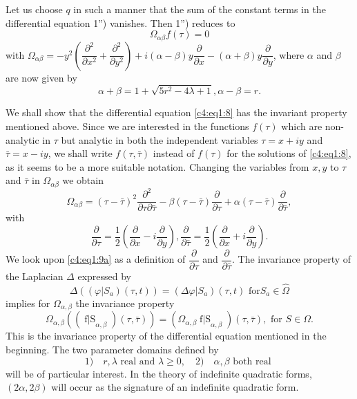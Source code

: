 Let us choose $q$ in such a manner that the sum of the constant terms
in the differential equation 1'') vanishes. Then 1'') reduces to 
\begin{equation*}
\Omega_{\alpha\beta}f(\tau) = 0 \tag{8}\label{c4:eq1:8}
\end{equation*}
with $\Omega_{\alpha\beta}= -y^2(\dfrac{\partial^2}{\partial x^2} +
\dfrac{\partial^2}{\partial y^2}) +
i(\alpha-\beta)y\dfrac{\partial}{\partial x} - (\alpha+\beta)
y\dfrac{\partial}{\partial y}$, where \pageoriginale $\alpha$ and
$\beta$ are now given by
$$ 
\alpha + \beta = 1 + \sqrt{5r^2 - 4\lambda + 1}, \alpha - \beta = r.
$$

We shall show that the differential equation \eqref{c4:eq1:8} has the invariant
property mentioned above. Since we are interested in the functions
$f(\tau)$ which are non-analytic in $\tau$ but analytic in both the
independent variables $\tau=x+iy$ and $\bar{\tau}=x-iy$, we shall
write $f(\tau,\bar{\tau})$ instead of $f(\tau)$ for the solutions of
\eqref{c4:eq1:8}, as it seems to be a more suitable notation. Changing the
variables from $x,y$ to $\tau$ and $\bar{\tau}$ in
$\Omega_{\alpha\beta}$ we obtain 
\begin{equation*}
\Omega_{\alpha\beta} = (\tau-\bar{\tau})^2 \frac{\partial^2}{\partial
  \tau \partial \bar{\tau}} - \beta(\tau-\bar{\tau})
\frac{\partial}{\partial \tau} + \alpha (\tau-\bar{\tau})
\frac{\partial}{\partial \bar{\tau}}, \tag{9}\label{c4:eq1:9}
\end{equation*}
with 
\begin{equation*}
\frac{\partial}{\partial \tau} = \frac{1}{2} (\frac{\partial}{\partial
x} - i \frac{\partial}{\partial y}), \frac{\partial}{\partial
  \bar{\tau}}  =\frac{1}{2} (\frac{\partial}{\partial
  x}+i\frac{\partial}{\partial y}). \tag{9a}\label{c4:eq1:9a}
\end{equation*}
We look upon \eqref{c4:eq1:9a} as a definition of $\dfrac{\partial}{\partial \tau}$
and $\dfrac{\partial}{\partial \bar{\tau}}$. The invariance property
of the Laplacian $\Delta$ expressed by
$$
\Delta((\varphi|S_a)(\tau,t)) = (\Delta\varphi|S_a)(\tau,t) \text{ for
} S_a \in \hat{\Omega}
$$
implies for $\Omega_{\alpha,\beta}$ the invariance property
\begin{equation*}
\Omega_{\alpha, \beta} ((\mathop{f|S}_{\alpha, \beta})(\tau,
\bar{\tau})) = (\Omega_{\alpha, \beta} \mathop{f|S}_{\alpha,\beta})
(\tau, \bar{\tau}), \text{ for } S\in \Omega. \tag{10}\label{c4:eq1:10}
\end{equation*}
This is the invariance property of the differential equation mentioned
in the beginning. The two parameter domains defined by
\begin{equation*}
1) \quad r,\lambda \text{ real and } \lambda \geq 0, \quad 2) \quad
\alpha, \beta \text{ both real } \tag{11}\label{c4:eq1:11}
\end{equation*}
will be of particular interest. In the theory of indefinite quadratic
forms, $(2\alpha, 2\beta)$ will \pageoriginale occur as the signature of an
indefinite quadratic form.

